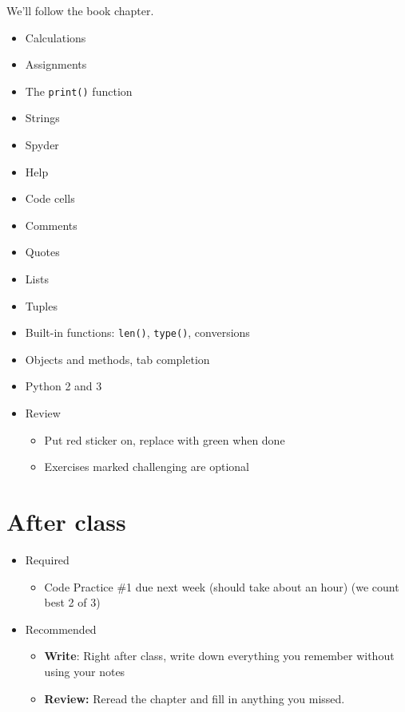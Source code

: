 \documentclass[11pt]{article}
\begin{document}
We'll follow the book chapter.
\begin{itemize}
\item Calculations %
\item Assignments
\item The {\tt print()} function
\item Strings
\item Spyder
\item Help
\item Code cells
\item Comments
\item Quotes
\item Lists
\item Tuples
\item Built-in functions:  {\tt len()}, {\tt type()}, conversions
\item Objects and methods, tab completion
\item Python 2 and 3
\item Review
\begin{itemize}
\item Put red sticker on, replace with green when done
\item Exercises marked challenging are optional
\end{itemize}
\end{itemize}

\section*{After class}

\begin{itemize}
\item Required
\begin{itemize}
\item Code Practice \#1 due next week (should take about an hour) (we count best 2 of 3)
\end{itemize}
\item Recommended
\begin{itemize}
\item {\bf Write}:  Right after class, write down everything you remember without using your notes
\item {\bf Review:} Reread the chapter and fill in anything you missed.
\end{itemize}
\end{itemize}


\end{document}
